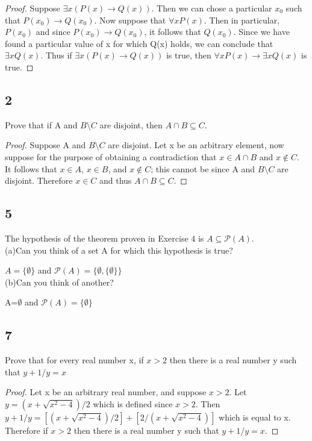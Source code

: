 \documentclass{article}
\begin{document}
\begin{proof}
Suppose $\exists x(P(x)\rightarrow Q(x))$. Then we can chose a particular $x_{0}$ such that  $P(x_{0})\rightarrow Q(x_{0})$. Now suppose that $\forall x P(x)$. Then in particular, $P(x_{0})$ and since $P(x_{0})\rightarrow Q(x_{0})$, it follows that $Q(x_{0})$. Since we have found a particular value of x for which Q(x) holds, we can conclude that $\exists x Q(x)$. Thus if $\exists x(P(x)\rightarrow Q(x))$ is true, then $\forall x P(x) \rightarrow \exists x Q(x)$ is true.
\end{proof}

\subsection{2}
Prove that if A and $B \setminus C $ are disjoint, then $A \cap B \subseteq C$.
\begin{proof}
Suppose  A and $B \setminus C $ are disjoint. Let x be an arbitrary element, now suppose for the purpose of obtaining a contradiction that $x \in A \cap B$ and $x \notin C$. It follows that $x\in A$, $x \in B$, and $x \notin C$; this cannot be since A and $B \setminus C $ are disjoint. Therefore $x\in C$ and thus $A \cap B \subseteq C$.
\end{proof}
\subsection{5}
The hypothesis of the theorem proven in Exercise 4 is $A \subseteq \mathscr{P}(A)$.
\\
(a)Can you think of a set A for which this hypothesis is true?

$A=\{\emptyset \}$ and $\mathscr{P}(A)=\{\emptyset,\{\emptyset \}\}$
\\ 
(b)Can you think of another?


A=$\emptyset$ and $\mathscr{P}(A)=\{\emptyset \}$
\subsection{7}
Prove that for every real number x, if $x>2$ then there is a real number y such that  $y+1/y=x$
 
\begin{proof} Let x be an arbitrary real number, and suppose $x>2$. Let $y=(x+ \sqrt{x^2-4})/2$ which is defined since $x>2$. Then $y+1/y=[(x+ \sqrt{x^2-4})/2] +[2/(x+ \sqrt{x^2-4})]$ which is equal to x. Therefore if $x>2$ then there is a real number y such that  $y+1/y=x$.
\end{proof}
\newpage
\end{document}
